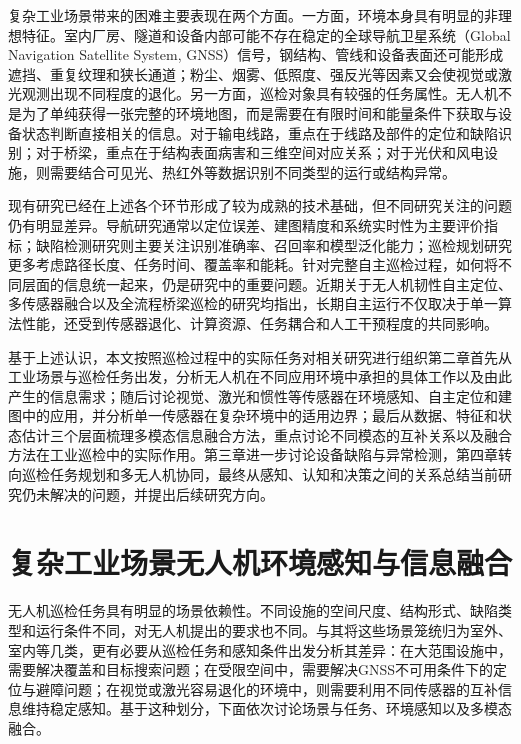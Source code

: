 复杂工业场景带来的困难主要表现在两个方面。一方面，环境本身具有明显的非理想特征。室内厂房、隧道和设备内部可能不存在稳定的全球导航卫星系统（Global Navigation Satellite System, GNSS）信号，钢结构、管线和设备表面还可能形成遮挡、重复纹理和狭长通道；粉尘、烟雾、低照度、强反光等因素又会使视觉或激光观测出现不同程度的退化\cite{Ozaslan2017Penstocks,Chang2023GNSSDenied,Zhao2024ResilientUAV,jarraya2025gnssdenied,boiteau2024uavlowvisibility}。另一方面，巡检对象具有较强的任务属性。无人机不是为了单纯获得一张完整的环境地图，而是需要在有限时间和能量条件下获取与设备状态判断直接相关的信息。对于输电线路，重点在于线路及部件的定位和缺陷识别；对于桥梁，重点在于结构表面病害和三维空间对应关系；对于光伏和风电设施，则需要结合可见光、热红外等数据识别不同类型的运行或结构异常\cite{Nguyen2018PowerLine,Jeong2020BridgeReview,Yahya2022PVReview,Liu2022WindRobots,Sun2022WindMonitoring}。

现有研究已经在上述各个环节形成了较为成熟的技术基础，但不同研究关注的问题仍有明显差异。导航研究通常以定位误差、建图精度和系统实时性为主要评价指标；缺陷检测研究则主要关注识别准确率、召回率和模型泛化能力；巡检规划研究更多考虑路径长度、任务时间、覆盖率和能耗。针对完整自主巡检过程，如何将不同层面的信息统一起来，仍是研究中的重要问题。近期关于无人机韧性自主定位、多传感器融合以及全流程桥梁巡检的研究均指出，长期自主运行不仅取决于单一算法性能，还受到传感器退化、计算资源、任务耦合和人工干预程度的共同影响\cite{Zhao2024ResilientUAV,Li2025UAVFusion,Zhang2022UBI,Alqudsi2026GNSSDenied,zhao2024uavresilient,zhao2025resilient}。

基于上述认识，本文按照巡检过程中的实际任务对相关研究进行组织第二章首先从工业场景与巡检任务出发，分析无人机在不同应用环境中承担的具体工作以及由此产生的信息需求；随后讨论视觉、激光和惯性等传感器在环境感知、自主定位和建图中的应用，并分析单一传感器在复杂环境中的适用边界；最后从数据、特征和状态估计三个层面梳理多模态信息融合方法，重点讨论不同模态的互补关系以及融合方法在工业巡检中的实际作用。第三章进一步讨论设备缺陷与异常检测，第四章转向巡检任务规划和多无人机协同，最终从感知、认知和决策之间的关系总结当前研究仍未解决的问题，并提出后续研究方向。

\section{复杂工业场景无人机环境感知与信息融合}

无人机巡检任务具有明显的场景依赖性。不同设施的空间尺度、结构形式、缺陷类型和运行条件不同，对无人机提出的要求也不同。与其将这些场景笼统归为室外、室内等几类，更有必要从巡检任务和感知条件出发分析其差异：在大范围设施中，需要解决覆盖和目标搜索问题；在受限空间中，需要解决GNSS不可用条件下的定位与避障问题；在视觉或激光容易退化的环境中，则需要利用不同传感器的互补信息维持稳定感知。基于这种划分，下面依次讨论场景与任务、环境感知以及多模态融合。

